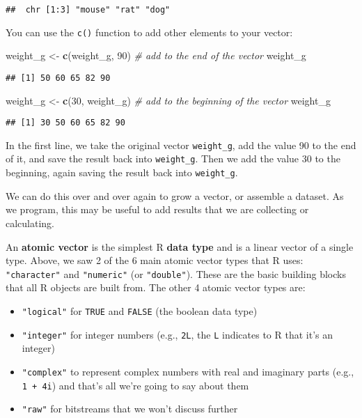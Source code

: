 \documentclass[]{book}
\newenvironment{Shaded}{\begin{snugshade}}{\end{snugshade}}
\newcommand{\CommentTok}[1]{\textcolor[rgb]{0.56,0.35,0.01}{\textit{#1}}}
\newcommand{\DecValTok}[1]{\textcolor[rgb]{0.00,0.00,0.81}{#1}}
\newcommand{\KeywordTok}[1]{\textcolor[rgb]{0.13,0.29,0.53}{\textbf{#1}}}
\newcommand{\NormalTok}[1]{#1}
\newcommand{\StringTok}[1]{\textcolor[rgb]{0.31,0.60,0.02}{#1}}
\providecommand{\tightlist}{%
  \setlength{\itemsep}{0pt}\setlength{\parskip}{0pt}}
\begin{document}
\begin{verbatim}
##  chr [1:3] "mouse" "rat" "dog"
\end{verbatim}

You can use the \texttt{c()} function to add other elements to your vector:

\begin{Shaded}
\begin{Highlighting}[]
\NormalTok{weight_g <-}\StringTok{ }\KeywordTok{c}\NormalTok{(weight_g, }\DecValTok{90}\NormalTok{) }\CommentTok{# add to the end of the vector}
\NormalTok{weight_g}
\end{Highlighting}
\end{Shaded}

\begin{verbatim}
## [1] 50 60 65 82 90
\end{verbatim}

\begin{Shaded}
\begin{Highlighting}[]
\NormalTok{weight_g <-}\StringTok{ }\KeywordTok{c}\NormalTok{(}\DecValTok{30}\NormalTok{, weight_g) }\CommentTok{# add to the beginning of the vector}
\NormalTok{weight_g}
\end{Highlighting}
\end{Shaded}

\begin{verbatim}
## [1] 30 50 60 65 82 90
\end{verbatim}

In the first line, we take the original vector \texttt{weight\_g}, add the value 90 to the end of it, and save the result back into \texttt{weight\_g}. Then we add the value 30 to the beginning, again saving the result back into \texttt{weight\_g}.

We can do this over and over again to grow a vector, or assemble a dataset. As we program, this may be useful to add results that we are collecting or calculating.

An \textbf{atomic vector} is the simplest R \textbf{data type} and is a linear vector of a single type. Above, we saw 2 of the 6 main atomic vector types that R uses: \texttt{"character"} and \texttt{"numeric"} (or \texttt{"double"}). These are the basic building blocks that all R objects are built from. The other 4 atomic vector types are:

\begin{itemize}
\tightlist
\item
  \texttt{"logical"} for \texttt{TRUE} and \texttt{FALSE} (the boolean data type)
\item
  \texttt{"integer"} for integer numbers (e.g., \texttt{2L}, the \texttt{L} indicates to R that it's an integer)
\item
  \texttt{"complex"} to represent complex numbers with real and imaginary parts (e.g., \texttt{1\ +\ 4i}) and that's all we're going to say about them
\item
  \texttt{"raw"} for bitstreams that we won't discuss further
\end{itemize}
\end{document}
